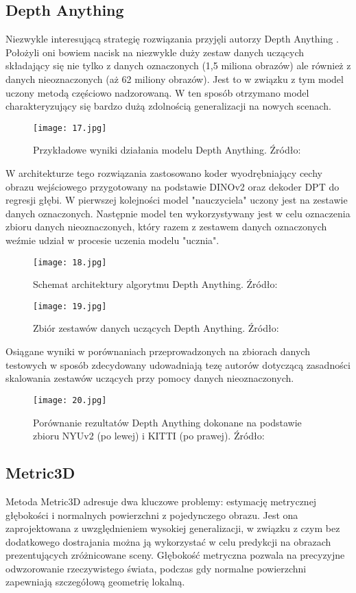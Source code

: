 \subsection{Depth Anything}
Niezwykle interesującą strategię rozwiązania przyjęli autorzy Depth Anything \cite{yang2024}. Położyli oni bowiem nacisk na niezwykle duży zestaw danych uczących składający się nie tylko z danych oznaczonych (1,5 miliona obrazów) ale również z danych nieoznaczonych (aż 62 miliony obrazów). Jest to w związku z tym model uczony metodą częściowo nadzorowaną. W ten sposób otrzymano model charakteryzujący się bardzo dużą zdolnością generalizacji na nowych scenach.
\begin{figure}[H]
    \centering
    \texttt{[image: 17.jpg]}
    \caption{Przykładowe wyniki działania modelu Depth Anything. Źródło: \cite{yang2024}}
    \label{depth-anything}
\end{figure}
W architekturze tego rozwiązania zastosowano koder wyodrębniający cechy obrazu wejściowego przygotowany na podstawie DINOv2 \cite{oquab2024} oraz dekoder DPT do regresji głębi. W pierwszej kolejności model "nauczyciela" uczony jest na zestawie danych oznaczonych. Następnie model ten wykorzystywany jest w celu oznaczenia zbioru danych nieoznaczonych, który razem z zestawem danych oznaczonych weźmie udział w procesie uczenia modelu "ucznia".
\begin{figure}[H]
    \centering
    \texttt{[image: 18.jpg]}
    \caption{Schemat architektury algorytmu Depth Anything. Źródło: \cite{yang2024}}
    \label{fig:depth-anything-schema}
\end{figure}
\begin{figure}[H]
    \centering
    \texttt{[image: 19.jpg]}
    \caption{Zbiór zestawów danych uczących Depth Anything. Źródło: \cite{yang2024}}
    \label{fig:depth-anything-data}
\end{figure}
Osiągane wyniki w porównaniach przeprowadzonych na zbiorach danych testowych w sposób zdecydowany udowadniają tezę autorów dotyczącą zasadności skalowania zestawów uczących przy pomocy danych nieoznaczonych.
\begin{figure}[H]
    \centering
    \texttt{[image: 20.jpg]}
    \caption{Porównanie rezultatów Depth Anything dokonane na podstawie zbioru NYUv2 (po lewej) i KITTI (po prawej). Źródło: \cite{yang2024}}
    \label{fig:depth-anything-results}
\end{figure}

\subsection{Metric3D}
Metoda Metric3D \cite{hu2024} adresuje dwa kluczowe problemy: estymację metrycznej głębokości i normalnych powierzchni z pojedynczego obrazu. Jest ona zaprojektowana z uwzględnieniem wysokiej generalizacji, w związku z czym bez dodatkowego dostrajania można ją wykorzystać w celu predykcji na obrazach prezentujących zróżnicowane sceny.
Głębokość metryczna pozwala na precyzyjne odwzorowanie rzeczywistego świata, podczas gdy normalne powierzchni zapewniają szczegółową geometrię lokalną.


